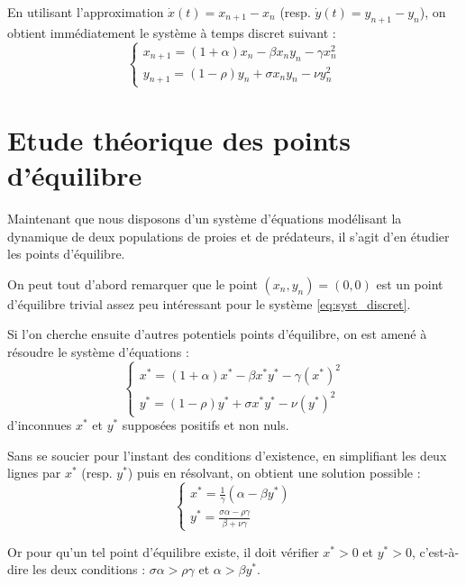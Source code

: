 En utilisant l'approximation $\dot{x}(t) = x_{n+1} - x_n$ (resp. $\dot{y}(t) = y_{n+1} - y_n$), on obtient immédiatement le système à temps discret suivant :
\begin{equation}
    \label{eq:syst_discret}
    \begin{cases}
        x_{n+1} = (1 + \alpha) x_n - \beta x_n y_n - \gamma x_n^2 \\
        y_{n+1} = (1 - \rho) y_n + \sigma x_n y_n - \nu y_n^2
    \end{cases}
\end{equation}


\section{Etude théorique des points d'équilibre}

Maintenant que nous disposons d'un système d'équations modélisant la dynamique de deux populations de proies et de prédateurs, il s'agit d'en étudier les points d'équilibre.

On peut tout d'abord remarquer que le point $(x_n, y_n) = (0, 0)$ est un point d'équilibre trivial assez peu intéressant pour le système \ref{eq:syst_discret}.

Si l'on cherche ensuite d'autres potentiels points d'équilibre, on est amené à résoudre le système d'équations :
\begin{equation}
    \begin{cases}
        x^* = (1 + \alpha) x^* - \beta x^* y^* - \gamma (x^*)^2 \\
        y^* = (1 - \rho) y^* + \sigma x^* y^* - \nu (y^*)^2
    \end{cases}
\end{equation}
d'inconnues $x^*$ et $y^*$ supposées positifs et non nuls.

Sans se soucier pour l'instant des conditions d'existence, en simplifiant les deux lignes par $x^*$ (resp. $y^*$) puis en résolvant, on obtient une solution possible :
\begin{equation}
    \label{eq:equilibre}
    \begin{cases}
        x^* = \frac{1}{\gamma} (\alpha - \beta y^*) \\
        y^* = \frac{\sigma \alpha - \rho \gamma}{\beta + \nu \gamma}
    \end{cases}
\end{equation}

Or pour qu'un tel point d'équilibre existe, il doit vérifier $x^* > 0$ et $y^* > 0$, c'est-à-dire les deux conditions : $\sigma \alpha > \rho \gamma$ et $\alpha > \beta y^*$.
\vspace{5pt}

